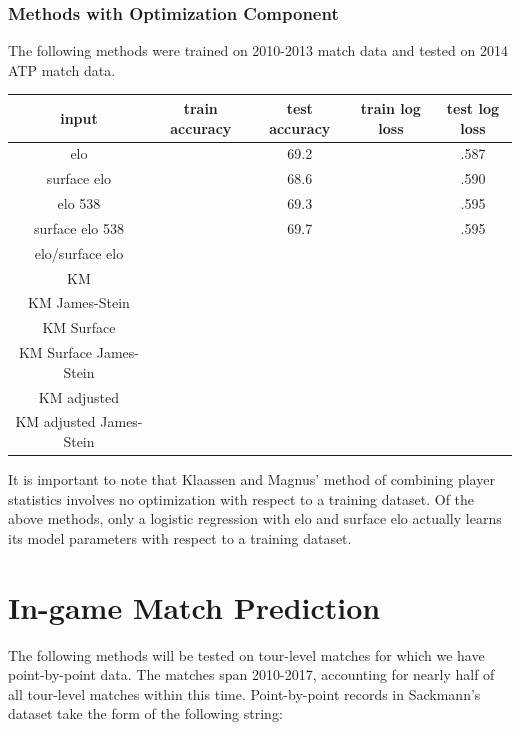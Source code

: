 \documentclass[chapterprefix=false]{report}
\begin{document}
\subsection{Methods with Optimization Component}


The following methods were trained on 2010-2013 match data and tested on 2014 ATP match data.

\begin{center}
\begin{tabular}{ |c|c|c|c|c| } 
 \hline
 input & train accuracy & test accuracy
& train log loss & test log loss \\ 
 \hline
  elo & & 69.2 & & .587
   \\ 
 \hline
 surface elo & & 68.6 & & .590
  \\ 
 \hline
 elo 538 & & 69.3 & & .595 \\ 
 \hline
 surface elo 538 & & 69.7 & & .595 \\ 
 \hline
 elo/surface elo &  &  &  & \\ 
 \hline
 KM &  &  &  & \\ 
 \hline
 KM James-Stein &  &  &  & \\ 
 \hline
  KM Surface &  &  &  & \\ 
 \hline
 KM Surface James-Stein &  &  &  & \\ 
 \hline
 KM adjusted &  &  &  & \\ 
 \hline
 KM adjusted James-Stein &  &  &  & \\ 
 \hline
\end{tabular}
\end{center}

It is important to note that Klaassen and Magnus' method of combining player statistics involves no optimization with respect to a training dataset. Of the above methods, only a logistic regression with elo and surface elo actually learns its model parameters with respect to a training dataset. 



\chapter{In-game Match Prediction}


The following methods will be tested on tour-level matches for which we have point-by-point data. The matches span 2010-2017, accounting for nearly half of all tour-level matches within this time. Point-by-point records in Sackmann's dataset take the form of the following string:
\end{document}
